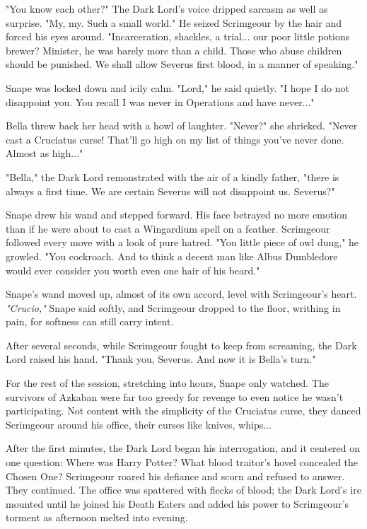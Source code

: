 "You know each other?" The Dark Lord's voice dripped sarcasm as well as surprise. "My, my. Such a small world." He seized Scrimgeour by the hair and forced his eyes around. "Incarceration, shackles, a trial... our poor little potions brewer? Minister, he was barely more than a child. Those who abuse children should be punished. We shall allow Severus first blood, in a manner of speaking."

Snape was locked down and icily calm. "Lord," he said quietly. "I hope I do not disappoint you. You recall I was never in Operations and have never..."

Bella threw back her head with a howl of laughter. "Never?" she shrieked. "Never cast a Cruciatus curse! That'll go high on my list of things you've never done. Almost as high..."

"Bella," the Dark Lord remonstrated with the air of a kindly father, "there is always a first time. We are certain Severus will not disappoint us. Severus?"

Snape drew his wand and stepped forward. His face betrayed no more emotion than if he were about to cast a Wingardium spell on a feather. Scrimgeour followed every move with a look of pure hatred. "You little piece of owl dung," he growled. "You cockroach. And to think a decent man like Albus Dumbledore would ever consider you worth even one hair of his beard."

Snape's wand moved up, almost of its own accord, level with Scrimgeour's heart. \emph{"Crucio,"} Snape said softly, and Scrimgeour dropped to the floor, writhing in pain, for softness can still carry intent.

After several seconds, while Scrimgeour fought to keep from screaming, the Dark Lord raised his hand. "Thank you, Severus. And now it is Bella's turn."

For the rest of the session, stretching into hours, Snape only watched. The survivors of Azkaban were far too greedy for revenge to even notice he wasn't participating. Not content with the simplicity of the Cruciatus curse, they danced Scrimgeour around his office, their curses like knives, whips...

After the first minutes, the Dark Lord began his interrogation, and it centered on one question: Where was Harry Potter? What blood traitor's hovel concealed the Chosen One? Scrimgeour roared his defiance and scorn and refused to answer. They continued. The office was spattered with flecks of blood; the Dark Lord's ire mounted until he joined his Death Eaters and added his power to Scrimgeour's torment as afternoon melted into evening.

